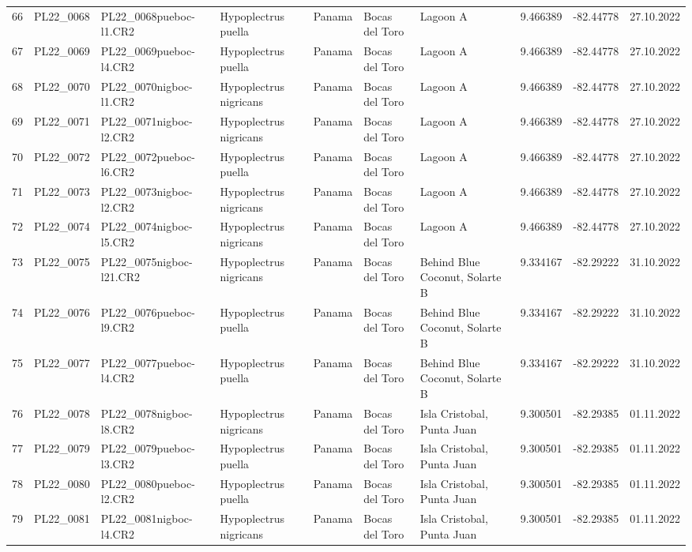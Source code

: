 \begin{table}[ht]
\begin{tabular}{rlllllllll}
  66 & PL22\_0068 & PL22\_0068pueboc-l1.CR2 & Hypoplectrus puella & Panama & Bocas del Toro & Lagoon A & 9.466389 & -82.44778 & 27.10.2022 \\ 
  67 & PL22\_0069 & PL22\_0069pueboc-l4.CR2 & Hypoplectrus puella & Panama & Bocas del Toro & Lagoon A & 9.466389 & -82.44778 & 27.10.2022 \\ 
  68 & PL22\_0070 & PL22\_0070nigboc-l1.CR2 & Hypoplectrus nigricans  & Panama & Bocas del Toro & Lagoon A & 9.466389 & -82.44778 & 27.10.2022 \\ 
  69 & PL22\_0071 & PL22\_0071nigboc-l2.CR2 & Hypoplectrus nigricans  & Panama & Bocas del Toro & Lagoon A & 9.466389 & -82.44778 & 27.10.2022 \\ 
  70 & PL22\_0072 & PL22\_0072pueboc-l6.CR2 & Hypoplectrus puella & Panama & Bocas del Toro & Lagoon A & 9.466389 & -82.44778 & 27.10.2022 \\ 
  71 & PL22\_0073 & PL22\_0073nigboc-l2.CR2 & Hypoplectrus nigricans  & Panama & Bocas del Toro & Lagoon A & 9.466389 & -82.44778 & 27.10.2022 \\ 
  72 & PL22\_0074 & PL22\_0074nigboc-l5.CR2 & Hypoplectrus nigricans  & Panama & Bocas del Toro & Lagoon A & 9.466389 & -82.44778 & 27.10.2022 \\ 
  73 & PL22\_0075 & PL22\_0075nigboc-l21.CR2 & Hypoplectrus nigricans  & Panama & Bocas del Toro & Behind Blue Coconut, Solarte B & 9.334167 & -82.29222 & 31.10.2022 \\ 
  74 & PL22\_0076 & PL22\_0076pueboc-l9.CR2 & Hypoplectrus puella & Panama & Bocas del Toro & Behind Blue Coconut, Solarte B & 9.334167 & -82.29222 & 31.10.2022 \\ 
  75 & PL22\_0077 & PL22\_0077pueboc-l4.CR2 & Hypoplectrus puella & Panama & Bocas del Toro & Behind Blue Coconut, Solarte B & 9.334167 & -82.29222 & 31.10.2022 \\ 
  76 & PL22\_0078 & PL22\_0078nigboc-l8.CR2 & Hypoplectrus nigricans  & Panama & Bocas del Toro & Isla Cristobal, Punta Juan & 9.300501 & -82.29385 & 01.11.2022 \\ 
  77 & PL22\_0079 & PL22\_0079pueboc-l3.CR2 & Hypoplectrus puella & Panama & Bocas del Toro & Isla Cristobal, Punta Juan & 9.300501 & -82.29385 & 01.11.2022 \\ 
  78 & PL22\_0080 & PL22\_0080pueboc-l2.CR2 & Hypoplectrus puella & Panama & Bocas del Toro & Isla Cristobal, Punta Juan & 9.300501 & -82.29385 & 01.11.2022 \\ 
  79 & PL22\_0081 & PL22\_0081nigboc-l4.CR2 & Hypoplectrus nigricans  & Panama & Bocas del Toro & Isla Cristobal, Punta Juan & 9.300501 & -82.29385 & 01.11.2022 \\ 

\end{tabular}
\end{table}
